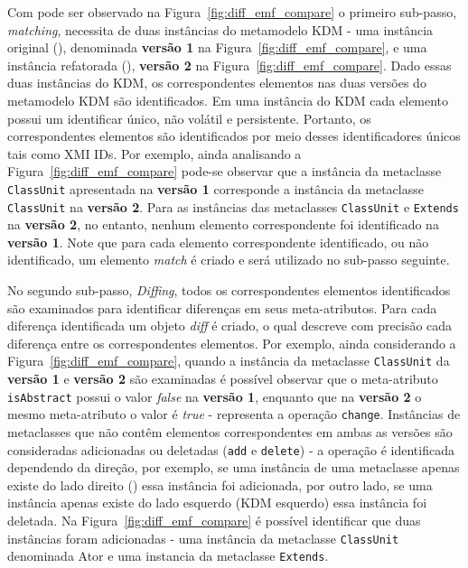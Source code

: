 Com pode ser observado na Figura~\ref{fig:diff_emf_compare} o primeiro sub-passo, \textit{matching}, necessita de duas instâncias do metamodelo KDM - uma instância original (), denominada \textbf{versão 1} na Figura~\ref{fig:diff_emf_compare}, e uma instância refatorada (), \textbf{versão 2} na Figura~\ref{fig:diff_emf_compare}. Dado essas duas instâncias do KDM, os correspondentes elementos nas duas versões do metamodelo KDM são identificados. Em uma instância do KDM cada elemento possui um identificar único, não volátil e persistente. Portanto, os correspondentes elementos são identificados por meio desses identificadores únicos tais como XMI IDs. Por exemplo, ainda analisando a Figura~\ref{fig:diff_emf_compare} pode-se observar que a instância da metaclasse \texttt{ClassUnit}  apresentada na \textbf{versão 1} corresponde a instância da metaclasse \texttt{ClassUnit}  na \textbf{versão 2}. Para as instâncias das metaclasses \texttt{ClassUnit}  e \texttt{Extends} na \textbf{versão 2}, no entanto, nenhum elemento correspondente foi identificado na \textbf{versão 1}. Note que para cada elemento correspondente identificado, ou não identificado, um elemento \textit{match} é criado e será utilizado no sub-passo seguinte.

No segundo sub-passo, \textit{Diffing}, todos os correspondentes elementos identificados são examinados para identificar diferenças em seus meta-atributos. Para cada diferença identificada um objeto \textit{diff} é criado, o qual descreve com precisão cada diferença entre os correspondentes elementos. Por exemplo, ainda considerando a Figura~\ref{fig:diff_emf_compare}, quando a instância da metaclasse \texttt{ClassUnit}  da \textbf{versão 1} e \textbf{versão 2} são examinadas é possível observar que o meta-atributo \texttt{isAbstract} possui o valor \textit{false} na \textbf{versão 1}, enquanto que na \textbf{versão 2} o mesmo meta-atributo o valor é \textit{true} - representa a operação \texttt{change}. Instâncias de metaclasses que não contêm elementos correspondentes em ambas as versões são consideradas adicionadas ou deletadas (\texttt{add} e \texttt{delete}) - a operação é identificada dependendo da direção, por exemplo, se uma instância de uma metaclasse apenas existe do lado direito () essa instância foi adicionada, por outro lado, se uma instância apenas existe do lado esquerdo (KDM esquerdo) essa instância foi deletada. Na Figura~\ref{fig:diff_emf_compare} é possível identificar que duas instâncias foram adicionadas - uma instância da metaclasse \texttt{ClassUnit} denominada Ator e uma instancia da metaclasse \texttt{Extends}.

